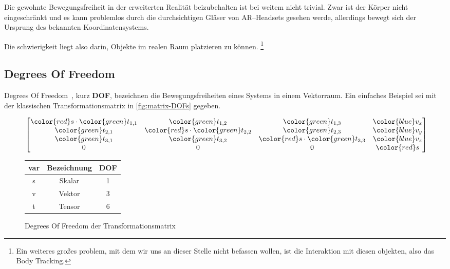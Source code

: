 Die gewohnte Bewegungsfreiheit in der erweiterten Realität beizubehalten ist bei weitem nicht trivial.
Zwar ist der Körper nicht eingeschränkt und es kann problemlos durch die durchsichtigen Gläser von AR--Headsets gesehen werde, allerdings bewegt sich der Ursprung des bekannten Koordinatensystems.

Die schwierigkeit liegt also darin, Objekte im realen Raum platzieren zu können.
\footnote{Ein weiteres großes problem, mit dem wir uns an dieser Stelle nicht befassen wollen, ist die Interaktion mit diesen objekten, also das Body Tracking.}

\subsection{Degrees Of Freedom}\label{subsec:degrees-of-freedom}
    Degrees Of Freedom~\autocite{wikipedia-contributors-2023B}, kurz \textbf{DOF}, bezeichnen die Bewegungsfreiheiten eines Systems in einem Vektorraum.
    Ein einfaches Beispiel sei mit der klassischen Transformationsmatrix in \autoref{fig:matrix-DOFs} gegeben.

    \begin{figure}[ht!]
        \begin{center}
            \begin{math}
                \begin{bmatrix}
                {\color{red} s}
                    \cdot {\color{green} t_{1,1}} & {\color{green} t_{1,2}}                       & {\color{green} t_{1,3}}                       & {\color{blue} v_x} \\
                    {\color{green} t_{2,1}}       & {\color{red} s} \cdot {\color{green} t_{2,2}} & {\color{green} t_{2,3}}                       & {\color{blue} v_y} \\
                    {\color{green} t_{3,1}}       & {\color{green} t_{3,2}}                       & {\color{red} s} \cdot {\color{green} t_{3,3}} & {\color{blue} v_z} \\
                    0                             & 0                                             & 0                                             & {\color{red} s}
                \end{bmatrix}
            \end{math}
        \end{center}
        \begin{tabular}{c|c|c}
            var             & Bezeichnung & DOF \\
            \hline
            \color{red} s   & Skalar      & 1   \\
            \color{blue} v  & Vektor      & 3   \\
            \color{green} t & Tensor      & 6   \\
        \end{tabular}
        \caption{Degrees Of Freedom der Transformationsmatrix}
        \label{fig:matrix-DOFs}
    \end{figure}

